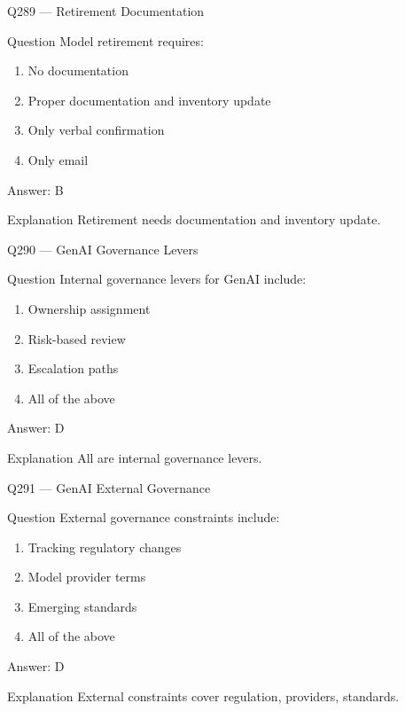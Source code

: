 \documentclass[aspectratio=169,8pt]{beamer}
\begin{document}
\begin{frame}{Q289 --- Retirement Documentation}
\begin{block}{Question}
	Model retirement requires:
	\begin{enumerate}
		\item No documentation
		\item Proper documentation and inventory update
		\item Only verbal confirmation
		\item Only email
	\end{enumerate}
\end{block}
\begin{exampleblock}{Answer: B}\end{exampleblock}
\begin{block}{Explanation}
	Retirement needs documentation and inventory update.
\end{block}
\end{frame}

\begin{frame}{Q290 --- GenAI Governance Levers}
\begin{block}{Question}
	Internal governance levers for GenAI include:
	\begin{enumerate}
		\item Ownership assignment
		\item Risk-based review
		\item Escalation paths
		\item All of the above
	\end{enumerate}
\end{block}
\begin{exampleblock}{Answer: D}\end{exampleblock}
\begin{block}{Explanation}
	All are internal governance levers.
\end{block}
\end{frame}

\begin{frame}{Q291 --- GenAI External Governance}
\begin{block}{Question}
	External governance constraints include:
	\begin{enumerate}
		\item Tracking regulatory changes
		\item Model provider terms
		\item Emerging standards
		\item All of the above
	\end{enumerate}
\end{block}
\begin{exampleblock}{Answer: D}\end{exampleblock}
\begin{block}{Explanation}
	External constraints cover regulation, providers, standards.
\end{block}
\end{frame}
\end{document}
